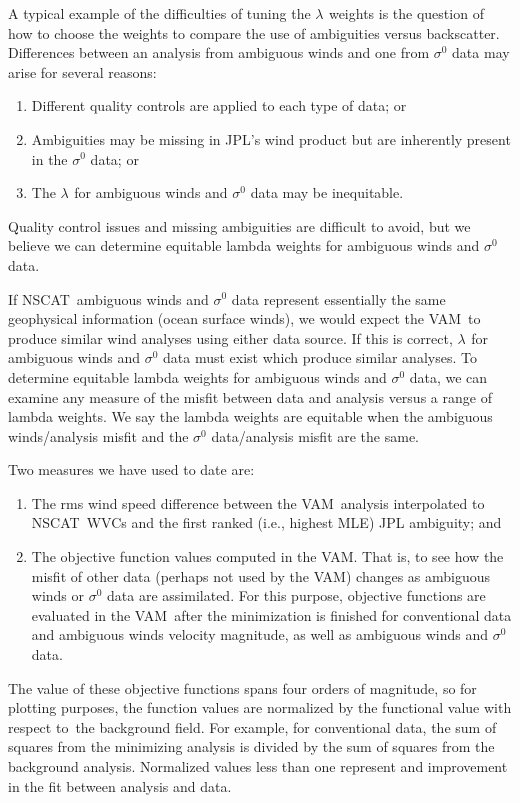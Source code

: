\documentclass[11pt]{article}
\newcommand{\gl}[1]{\mbox{$ \lambda_{#1} $}}
\newcommand{\nscat}{NSCAT}
\newcommand{\s}[1]{\mbox{$ \sigma^{#1} $}}
\newcommand{\vam}{VAM}
\newcommand{\wrt}{with respect to}
\begin{document}
A typical example of the difficulties of tuning the \gl{} weights is
the question of how to choose the weights to compare the use of
ambiguities versus backscatter.  Differences between an analysis from
ambiguous winds and one from \s0 data may arise for several reasons:
 \begin{enumerate} 
 \item Different quality controls are applied to each type of data; or
 \item Ambiguities may be missing in JPL's wind product but are
inherently present in the \s0 data; or
 \item The \gl{} for ambiguous winds and \s0 data may be inequitable.
 \end{enumerate} 
 Quality control issues and missing ambiguities are difficult to
avoid, but we believe we can determine equitable lambda weights for
ambiguous winds and \s0 data.

If \nscat\ ambiguous winds and \s0 data represent essentially the same
geophysical information (ocean surface winds), we would expect the
\vam\ to produce similar wind analyses using either data source.  If
this is correct, \gl{} for ambiguous winds and \s0 data must exist which
produce similar analyses.  To determine equitable lambda weights for
ambiguous winds and \s0 data, we can examine any measure of the misfit
between data and analysis versus a range of lambda weights.
We say the lambda weights are equitable when the ambiguous
winds/analysis misfit and the \s0 data/analysis misfit are the same.

Two measures we have used to date are:
 \begin{enumerate}
 \item The rms wind speed difference between the \vam\ analysis
interpolated to \nscat\ WVCs and the first ranked (i.e., highest MLE)
JPL ambiguity; and
 \item The objective function values computed in the \vam.  That is,
to see how the misfit of other data (perhaps not used by the \vam)
changes as ambiguous winds or \s0 data are assimilated.  For this
purpose, objective functions are evaluated in the \vam\ after the
minimization is finished for conventional data and ambiguous winds
velocity magnitude, as well as ambiguous winds and \s0 data.
 \end{enumerate}

The value of these objective functions spans four orders of magnitude,
so for plotting purposes, the function values are normalized by the
functional value \wrt\ the background field.  For example, for
conventional data, the sum of squares from the minimizing analysis is
divided by the sum of squares from the background analysis.
Normalized values less than one represent and improvement in the fit
between analysis and data.
\end{document}
